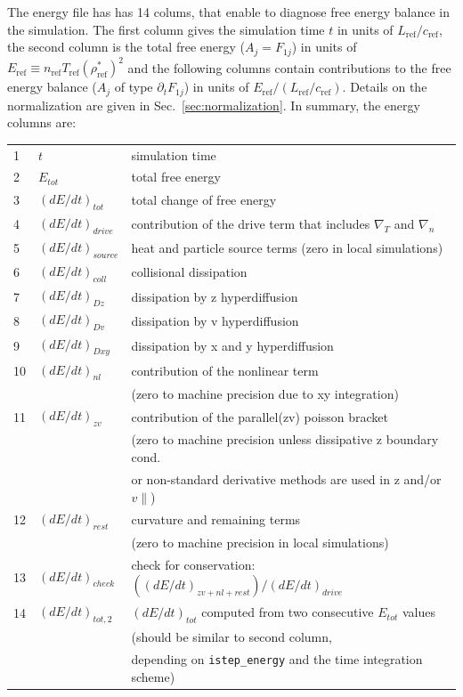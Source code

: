 \documentclass[12pt]{article}
\begin{document}
The energy file has has 14 colums, that enable to diagnose free energy
balance in the simulation. 
The first column gives the simulation time $t$ in units of
$L_\mathrm{ref}/c_\mathrm{ref}$, the second column is the total free
energy ($A_j=F_{1j}$) in units of $E_{\mathrm{ref}}\equiv n_{\mathrm{ref}} T_{\mathrm{ref}}
(\rho^*_{\mathrm{ref}})^2$ and the following columns contain contributions to the free
energy balance ($A_j$ of type $\partial_t F_{1j}$) in units of $E_{\mathrm{ref}}/(L_\mathrm{ref}/c_\mathrm{ref})$.
Details on the normalization are given in
Sec.~\ref{sec:normalization}. In summary, the energy columns are:\\[-5ex]
\begin{center}
\begin{tabular}{lll}
1  & $t$ & simulation time\\
2  & $E_{tot}$ & total free energy\\
3  & $(dE/dt)_{tot}$ & total change of free energy\\
4  & $(dE/dt)_{drive}$ & contribution of the drive term that includes $\nabla_T$ and $\nabla_n$\\
5  & $(dE/dt)_{source}$ &heat and particle source terms (zero in local simulations)\\
6  & $(dE/dt)_{coll}$ &collisional dissipation\\
7  & $(dE/dt)_{Dz}$  & dissipation by z hyperdiffusion\\
8  & $(dE/dt)_{Dv}$  & dissipation by v hyperdiffusion\\
9  & $(dE/dt)_{Dxy}$ & dissipation by x and y hyperdiffusion\\
10 & $(dE/dt)_{nl}$  & contribution of the nonlinear term\\
   &                 & (zero to machine precision due to xy integration)\\
11 & $(dE/dt)_{zv}$  & contribution of the parallel(zv) poisson bracket\\
   &                 & (zero to machine precision unless dissipative z boundary cond.\\
   &                 & or non-standard derivative methods are used in z and/or $v\|$)\\
12 & $(dE/dt)_{rest}$ & curvature and remaining terms \\
   &                 &(zero to machine precision in local simulations)\\
13 & $(dE/dt)_{check}$ & check for conservation:
$((dE/dt)_{zv+nl+rest})/(dE/dt)_{drive}$\\
14 &$(dE/dt)_{tot,2}$ & $(dE/dt)_{tot}$ computed from two consecutive $E_{tot}$ values\\
   &                 &(should be similar to second column,\\
   &                 &depending on \texttt{istep\_energy} and the time integration scheme)\\
\end{tabular}
\end{center}
\end{document}
